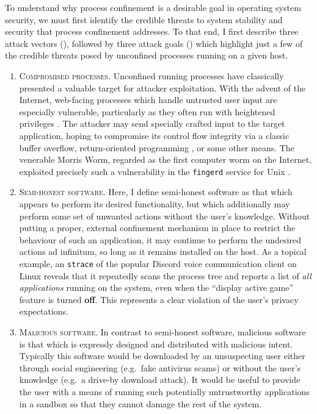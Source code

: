 \documentclass[dvipsnames, 12pt]{article}
\begin{document}
To understand why process confinement is a desirable goal in operating system
security, we must first identify the credible threats to system stability and
security that process confinement addresses. To that end, I first describe three
attack vectors (), followed by three attack goals
() which highlight just a few of the credible threats posed
by unconfined processes running on a given host.

\begin{enumerate}[label=\bfseries A\arabic*., ref=A\arabic*, labelindent=2em]
    \item \label{a:1} \textsc{Compromised processes.} Unconfined running
    processes have classically presented a valuable target for attacker
    exploitation. With the advent of the Internet, web-facing processes which
    handle untrusted user input are especially vulnerable, particularly as they
    often run with heightened privileges . The attacker may send
    specially crafted input to the target application, hoping to compromise its
    control flow integrity via a classic buffer overflow, return-oriented
    programming , or some other means. The venerable Morris Worm,
    regarded as the first computer worm on the Internet, exploited precisely
    such a vulnerability in the \texttt{fingerd} service for Unix .

    \item \label{a:2} \textsc{Semi-honest software.} Here, I define semi-honest
    software as that which appears to perform its desired functionality, but
    which additionally may perform some set of unwanted actions without the
    user's knowledge. Without putting a proper, external confinement mechanism
    in place to restrict the behaviour of such an application, it may continue
    to perform the undesired actions ad infinitum, so long as it remains
    installed on the host. As a topical example, an \texttt{strace} of the
    popular Discord \cite{discord} voice communication client on Linux reveals that
    it repeatedly scans the process tree and reports a list of \textit{all applications}
    running on the system, even when the \enquote{display active game} feature
    is turned \textbf{off}. This represents a clear violation of the user's
    privacy expectations.

    \item \label{a:3} \textsc{Malicious software.} In contrast to semi-honest
    software, malicious software is that which is expressly designed and
    distributed with malicious intent. Typically this software would be
    downloaded by an unsuspecting user either through social engineering
    (e.g.~fake antivirus scams) or without the user's knowledge (e.g.~a drive-by
    download attack). It would be useful to provide the user with a means of
    running such potentially untrustworthy applications in a sandbox so that
    they cannot damage the rest of the system.
\end{enumerate}
\end{document}
